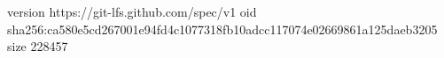 version https://git-lfs.github.com/spec/v1
oid sha256:ca580e5cd267001e94fd4c1077318fb10adcc117074e02669861a125daeb3205
size 228457
